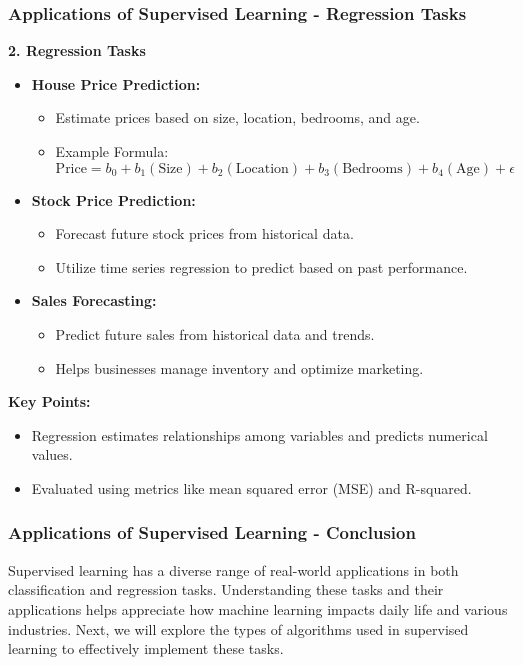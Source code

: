 \documentclass[aspectratio=169]{beamer}
\begin{document}
\begin{frame}[fragile]
    \frametitle{Applications of Supervised Learning - Regression Tasks}
    \textbf{2. Regression Tasks} 
    \begin{itemize}
        \item \textbf{House Price Prediction:}
        \begin{itemize}
            \item Estimate prices based on size, location, bedrooms, and age.
            \item Example Formula: 
            \begin{equation}
                \text{Price} = b_0 + b_1(\text{Size}) + b_2(\text{Location}) + b_3(\text{Bedrooms}) + b_4(\text{Age}) + \epsilon
            \end{equation}
        \end{itemize}

        \item \textbf{Stock Price Prediction:}
        \begin{itemize}
            \item Forecast future stock prices from historical data.
            \item Utilize time series regression to predict based on past performance.
        \end{itemize}

        \item \textbf{Sales Forecasting:}
        \begin{itemize}
            \item Predict future sales from historical data and trends.
            \item Helps businesses manage inventory and optimize marketing.
        \end{itemize}
    \end{itemize}
    
    \textbf{Key Points:}
    \begin{itemize}
        \item Regression estimates relationships among variables and predicts numerical values.
        \item Evaluated using metrics like mean squared error (MSE) and R-squared.
    \end{itemize}
\end{frame}

\begin{frame}[fragile]
    \frametitle{Applications of Supervised Learning - Conclusion}
    Supervised learning has a diverse range of real-world applications in both classification and regression tasks. 
    Understanding these tasks and their applications helps appreciate how machine learning impacts daily life and various industries. 
    Next, we will explore the types of algorithms used in supervised learning to effectively implement these tasks.
\end{frame}
\end{document}
